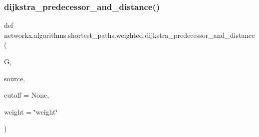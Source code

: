 \subsubsection{\texorpdfstring{dijkstra\+\_\+predecessor\+\_\+and\+\_\+distance()}{dijkstra\_predecessor\_and\_distance()}}
{\footnotesize\ttfamily def networkx.\+algorithms.\+shortest\+\_\+paths.\+weighted.\+dijkstra\+\_\+predecessor\+\_\+and\+\_\+distance (\begin{DoxyParamCaption}\item[{}]{G,  }\item[{}]{source,  }\item[{}]{cutoff = {\ttfamily None},  }\item[{}]{weight = {\ttfamily \char`\"{}weight\char`\"{}} }\end{DoxyParamCaption})}

